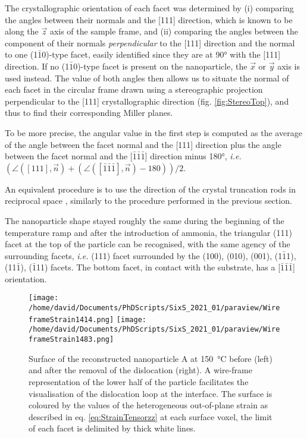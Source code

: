 The crystallographic orientation of each facet was determined by (i) comparing the angles between their normals and the [111] direction, which is known to be along the $\vec{z}$ axis of the sample frame, and (ii) comparing the angles between the component of their normals \textit{perpendicular} to the [111] direction and the normal to one (1$\bar{1}$0)-type facet, easily identified since they are at \ang{90} with the [111] direction.
If no (1$\bar{1}$0)-type facet is present on the nanoparticle, the $\vec{x}$ or $\vec{y}$ axis is used instead.
The value of both angles then allows us to situate the normal of each facet in the circular frame drawn using a stereographic projection perpendicular to the [111] crystallographic direction (fig. \ref{fig:StereoTop}), and thus to find their corresponding Miller planes.

To be more precise, the angular value in the first step is computed as the average of the angle between the facet normal and the [111] direction plus the angle between the facet normal and the [$\bar{1}\bar{1}\bar{1}$] direction minus \ang{180}, \textit{i.e.} $(\angle ([111], \vec{n}) + (\angle ([\bar{1}\bar{1}\bar{1}], \vec{n}) -180))/2$.

An equivalent procedure is to use the direction of the crystal truncation rods in reciprocal space \parencite{Richard2018}, similarly to the procedure performed in the previous section.

The nanoparticle shape stayed roughly the same during the beginning of the temperature ramp and after the introduction of ammonia, the triangular (111) facet at the top of the particle can be recognised, with the same agency of the surrounding facets, \textit{i.e.} (111) facet surrounded by the (100), (010), (001), (1$\bar{1}$1), (11$\bar{1}$), ($\bar{1}$11) facets.
The bottom facet, in contact with the substrate, has a [$\bar{1}\bar{1}\bar{1}$] orientation.

\begin{figure}[!htb]
    \centering
    \texttt{[image: /home/david/Documents/PhDScripts/SixS\_2021\_01/paraview/WireframeStrain1414.png]}
    \texttt{[image: /home/david/Documents/PhDScripts/SixS\_2021\_01/paraview/WireframeStrain1483.png]}
    \caption{
        Surface of the reconstructed nanoparticle A at \qty{150}{\degreeCelsius} before (left) and after the removal of the dislocation (right).
        A wire-frame representation of the lower half of the particle facilitates the visualisation of the dislocation loop at the interface.
        The surface is coloured by the values of the heterogeneous out-of-plane strain as described in eq. \ref{eq:StrainTensorzz} at each surface voxel, the limit of each facet is delimited by thick white lines.
    }
    \label{fig:AmaterasuDislocation}
\end{figure}

